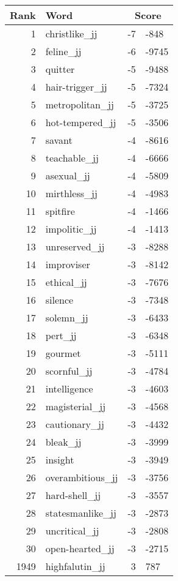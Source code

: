 \begin{longtable}[!htbp]{| rlr@{.}l |}
    \hline
    \textbf{Rank} & \textbf{Word} & \multicolumn{2}{c|}{\textbf{Score}} \\
    \hline
    \endhead
    1 & christlike\_jj & -7 & -848 \\
    2 & feline\_jj & -6 & -9745 \\
    3 & quitter & -5 & -9488 \\
    4 & hair-trigger\_jj & -5 & -7324 \\
    5 & metropolitan\_jj & -5 & -3725 \\
    6 & hot-tempered\_jj & -5 & -3506 \\
    7 & savant & -4 & -8616 \\
    8 & teachable\_jj & -4 & -6666 \\
    9 & asexual\_jj & -4 & -5809 \\
    10 & mirthless\_jj & -4 & -4983 \\
    11 & spitfire & -4 & -1466 \\
    12 & impolitic\_jj & -4 & -1413 \\
    13 & unreserved\_jj & -3 & -8288 \\
    14 & improviser & -3 & -8142 \\
    15 & ethical\_jj & -3 & -7676 \\
    16 & silence & -3 & -7348 \\
    17 & solemn\_jj & -3 & -6433 \\
    18 & pert\_jj & -3 & -6348 \\
    19 & gourmet & -3 & -5111 \\
    20 & scornful\_jj & -3 & -4784 \\
    21 & intelligence & -3 & -4603 \\
    22 & magisterial\_jj & -3 & -4568 \\
    23 & cautionary\_jj & -3 & -4432 \\
    24 & bleak\_jj & -3 & -3999 \\
    25 & insight & -3 & -3949 \\
    26 & overambitious\_jj & -3 & -3756 \\
    27 & hard-shell\_jj & -3 & -3557 \\
    28 & statesmanlike\_jj & -3 & -2873 \\
    29 & uncritical\_jj & -3 & -2808 \\
    30 & open-hearted\_jj & -3 & -2715 \\
    1949 & highfalutin\_jj & 3 & 787 \\

\end{longtable}
